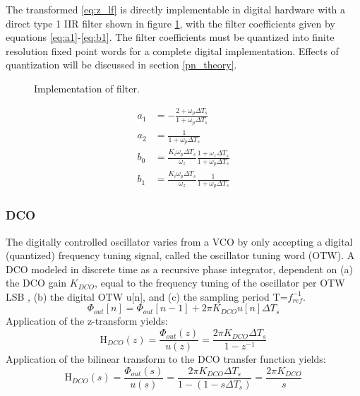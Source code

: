 		The transformed \ref{eq:z_lf} is directly implementable in digital hardware with a direct type 1 IIR filter shown in figure \ref{fig:filt_imple}, with the filter coefficients given by equations \ref{eq:a1}-\ref{eq:b1}. The filter coefficients must be quantized into finite resolution fixed point words for a complete digital implementation. Effects of quantization will be discussed in section \ref{pn_theory}.
		\begin{figure}[htb!]
			\center
			\caption{Implementation of filter.}
			\label{fig:filt_imple}
		\end{figure}
		\begin{align}
			a_1 &= -\frac{2+\omega_p\Delta T_s}{1+\omega_p\Delta T_s}\label{eq:a1}\\
			a_2 &= \frac{1}{1+\omega_p\Delta T_s} \\
			b_0 &= \frac{K_i\omega_p\Delta T_s}{\omega_z}\frac{1+\omega_z\Delta T_s}{1+\omega_p\Delta T_s}\\
			b_1 &= \frac{K_i\omega_p\Delta T_s}{\omega_z}\frac{1}{1+\omega_p\Delta T_s}\label{eq:b1}
		\end{align}

	\subsubsection{DCO}
		The digitally controlled oscillator varies from a VCO by only accepting a digital (quantized) frequency tuning signal, called the oscillator tuning word (OTW). A DCO modeled in discrete time as a recursive phase integrator, dependent on (a) the DCO gain $K_{DCO}$, equal to the frequency tuning of the oscillator per OTW LSB , (b) the digital OTW u[n], and (c) the sampling period T=$f_{ref}^{-1}$.
		\begin{equation}
			\Phi_{out}[n] = \Phi_{out}[n-1] + 2\pi K_{DCO}u[n]\Delta T_s
		\end{equation}
		Application of the z-transform yields:
		\begin{equation}
			\mathrm{H}_{DCO}(z) = \frac{\Phi_{out}(z)}{u(z)} = \frac{2\pi K_{DCO}\Delta T_s}{1-z^{-1}}
		\end{equation}
		Application of the bilinear transform to the DCO transfer function yields:
		\begin{equation}
			\mathrm{H}_{DCO}(s) = \frac{\Phi_{out}(s)}{u(s)} = \frac{2\pi K_{DCO}\Delta T_s}{1-(1-s\Delta T_s)} = \frac{2\pi K_{DCO}}{s} 
		\end{equation}

